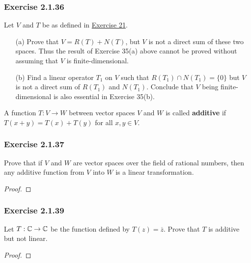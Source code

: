 \subsubsection{Exercise 2.1.36} Let \( V  \) and \( T  \) be as defined in {\hyperref[Exercise 21]{Exercise 21}}.
\begin{enumerate}
    \item[(a)] Prove that \( V = R(T) + N(T)  \), but \( V  \) is not a direct sum of these two spaces. Thus the result of Exercise 35(a) above cannot be proved without assuming that \( V  \) is finite-dimensional.
    \item[(b)] Find a linear operator \( T_{1}  \) on \( V  \) such that \( R(T_{1}) \cap N(T_{1}) = \{ 0  \}  \) but \( V  \) is not a direct sum of \( R(T_{1}) \) and \( N(T_{1})  \). Conclude that \( V  \) being finite-dimensional is also essential in Exercise 35(b).
\end{enumerate}

\begin{definition}[Additive]
    A function \( T: V \to W  \) between vector spaces \( V  \) and \( W  \) is called \textbf{additive} if \( T(x+y) = T(x) + T(y) \) for all \( x,y \in V  \).
\end{definition}

\subsubsection{Exercise 2.1.37} Prove that if \( V  \) and \( W  \) are vector spaces over the field of rational numbers, then any additive function from \( V  \) into \( W  \) is a linear transformation. 
\begin{proof}

\end{proof}

\subsubsection{Exercise 2.1.39} Let \( T: \mathbb{C} \to \mathbb{C}  \) be the function defined by \( T(z) = \overline{z} \). Prove that \( T  \) is additive but not linear.
\begin{proof}

\end{proof}

